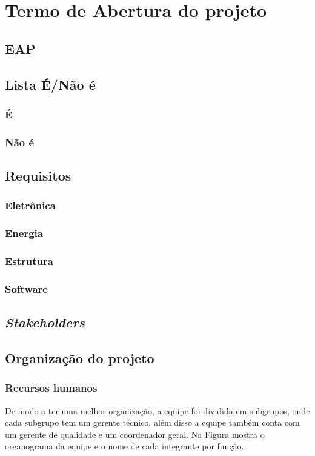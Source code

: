 \chapter{Termo de Abertura do projeto}

\section{EAP}
\section{Lista É/Não é}
\subsection{É}
\subsection{Não é}
\section{Requisitos}
\subsection{Eletrônica}
\subsection{Energia}
\subsection{Estrutura}
\subsection{Software}
\section{\emph{Stakeholders}}
\section{Organização do projeto}

\subsection{Recursos humanos}
  
  De modo a ter uma melhor organização, a equipe foi dividida em subgrupos, onde cada subgrupo tem um gerente técnico, além disso a equipe também conta com um gerente de qualidade e um coordenador geral. Na Figura %
 mostra o organograma da equipe e o nome de cada integrante por função.
 
